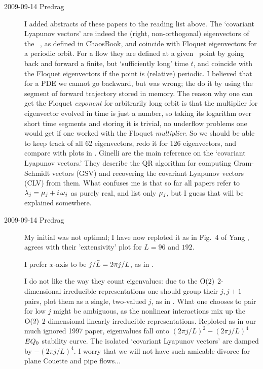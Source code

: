 \begin{description}
\item[2009-09-14 Predrag]
I added abstracts of these papers to the reading list above.
The `covariant Lyapunov vectors' are indeed the (right,
non-orthogonal) eigenvectors of the \jacobianM\ \jMps, as
defined in ChaosBook, and coincide with Floquet eigenvectors
for a periodic orbit. For a flow they are defined at a given
\statesp\ point by going back and forward a finite, but
`sufficiently long' time $t$, and coincide with the Floquet
eigenvectors if the point is (relative) periodic. I believed
that for a PDE we cannot go backward, but was wrong; the do
it by using the segment of forward trajectory stored in
memory. The reason why one can get the Floquet {\em exponent}
for arbitrarily long orbit is that the multiplier for eigenvector
evolved in time is just a number, so taking its logarithm over
short time segments and
storing it is trivial, no underflow problems one would get if
one worked with the Floquet {\em multiplier}. So we should be able
to keep track of all 62 eigenvectors, redo it for 126 eigenvectors,
and compare with plots in .
Ginelli \etal{} are the main
reference on the `covariant Lyapunov vectors.' They describe
the QR algorithm for computing Gram-Schmidt vectors (GSV) and
recovering the covariant Lyapunov vectors (CLV) from them.
What confuses me is that so far all papers refer to $\Lyap_j
= \eigRe_j + i \, \eigIm_j$ as purely real, and list only
$\eigRe_j$, but I guess that will be explained somewhere.

\item[2009-09-14 Predrag]
My initial  was not optimal; I have now
reploted it as in Fig.~4 of
Yang \etal{},
agrees with their 'extensivity' plot for $L=96$ and $192$.

I prefer $x$-axis to be $j/\tilde{L} = 2 \pi j/L$, as in
.

I do not like the way they count eigenvalues:  due to the $\textrm{O}(2)$
2-dimensional irreducible representations
one should group their $j,j+1$ pairs,
plot them as a single, two-valued $j$, as in
. What one chooses to pair for low
$j$ might be ambiguous, as the nonlinear interactions mix up
the $\textrm{O}(2)$ 2-dimensional linearly irreducible representations.
Reploted as in our much ignored 1997 paper,
eigenvalues fall onto $ (2 \pi j/L)^2 - (2 \pi j/L)^4 $
\eqv\ $EQ_{0}$  stability curve.
The isolated `covariant Lyapunov vectors'
are damped by $-(2 \pi j/L)^4$. I worry that we will not have such
amicable divorce for plane Couette and pipe flows...


\end{description}
